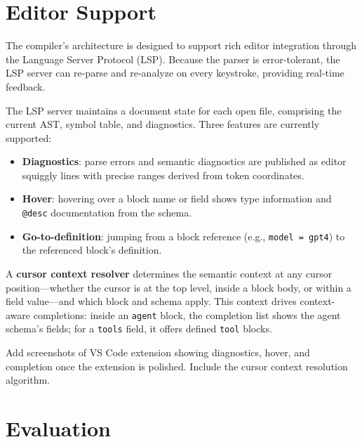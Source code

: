 \documentclass[sigconf,nonacm]{acmart}
\begin{document}
\section{Editor Support}
\label{sec:editor}

The compiler's architecture is designed to support rich editor integration
through the Language Server Protocol (LSP). Because the parser is
error-tolerant, the LSP server can re-parse and re-analyze on every
keystroke, providing real-time feedback.

The LSP server maintains a document state for each open file, comprising
the current AST, symbol table, and diagnostics. Three features are
currently supported:

\begin{itemize}[leftmargin=*]
  \item \textbf{Diagnostics}: parse errors and semantic diagnostics are
        published as editor squiggly lines with precise ranges derived from
        token coordinates.
  \item \textbf{Hover}: hovering over a block name or field shows type
        information and \texttt{@desc} documentation from the schema.
  \item \textbf{Go-to-definition}: jumping from a block reference
        (e.g., \texttt{model = gpt4}) to the referenced block's definition.
\end{itemize}

A \textbf{cursor context resolver} determines the semantic context at any
cursor position---whether the cursor is at the top level, inside a block
body, or within a field value---and which block and schema apply. This
context drives context-aware completions: inside an \texttt{agent} block,
the completion list shows the agent schema's fields; for a \texttt{tools}
field, it offers defined \texttt{tool} blocks.

\begin{todobox}
Add screenshots of VS Code extension showing diagnostics, hover, and
completion once the extension is polished. Include the cursor context
resolution algorithm.
\end{todobox}

\section{Evaluation}
\label{sec:evaluation}
\end{document}
